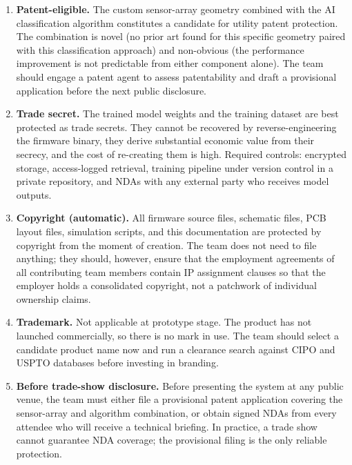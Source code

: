 \begin{enumerate}
  \item \textbf{Patent-eligible.}
        The custom sensor-array geometry combined with the AI classification
        algorithm constitutes a candidate for utility patent protection.
        The combination is novel (no prior art found for this specific geometry
        paired with this classification approach) and non-obvious (the performance
        improvement is not predictable from either component alone).
        The team should engage a patent agent to assess patentability and draft
        a provisional application before the next public disclosure.

  \item \textbf{Trade secret.}
        The trained model weights and the training dataset are best protected as
        trade secrets.
        They cannot be recovered by reverse-engineering the firmware binary,
        they derive substantial economic value from their secrecy, and the cost
        of re-creating them is high.
        Required controls: encrypted storage, access-logged retrieval, training
        pipeline under version control in a private repository, and NDAs with any
        external party who receives model outputs.

  \item \textbf{Copyright (automatic).}
        All firmware source files, schematic files, PCB layout files, simulation
        scripts, and this documentation are protected by copyright from the moment
        of creation.
        The team does not need to file anything; they should, however, ensure that
        the employment agreements of all contributing team members contain IP
        assignment clauses so that the employer holds a consolidated copyright, not
        a patchwork of individual ownership claims.

  \item \textbf{Trademark.}
        Not applicable at prototype stage.
        The product has not launched commercially, so there is no mark in use.
        The team should select a candidate product name now and run a clearance
        search against CIPO and USPTO databases before investing in branding.

  \item \textbf{Before trade-show disclosure.}
        Before presenting the system at any public venue, the team must either
        file a provisional patent application covering the sensor-array and
        algorithm combination, or obtain signed NDAs from every attendee who will
        receive a technical briefing.
        In practice, a trade show cannot guarantee NDA coverage; the provisional
        filing is the only reliable protection.
\end{enumerate}

